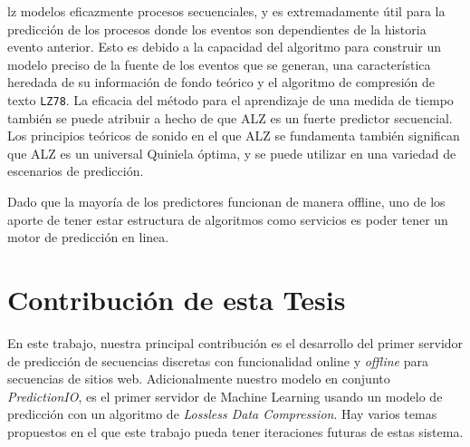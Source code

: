 %

lz modelos eficazmente procesos secuenciales, y es extremadamente útil para la predicción de los procesos donde los eventos son dependientes de la historia evento anterior. Esto es debido a la capacidad del algoritmo para construir un modelo preciso de la fuente de los eventos que se generan, una característica heredada de su información de fondo teórico y el algoritmo de compresión de texto \texttt{LZ78}.
%
La eficacia del método para el aprendizaje de una medida de tiempo también se puede atribuir a hecho de que ALZ es un fuerte predictor secuencial. Los principios teóricos de sonido en el que ALZ se fundamenta también significan que ALZ es un universal Quiniela óptima, y se puede utilizar en una variedad de escenarios de predicción.
%

Dado que la mayoría de los predictores funcionan de 
manera offline, uno de los aporte de tener estar estructura de algoritmos como servicios es poder tener un motor de predicción en linea.

\section{Contribución de esta Tesis}


En este trabajo,  nuestra principal contribución es el desarrollo del primer servidor de predicción de secuencias discretas con funcionalidad online y \emph{offline} para secuencias de  sitios web. Adicionalmente nuestro modelo en conjunto \emph{PredictionIO}, es el primer servidor de Machine Learning usando un modelo de predicción con un algoritmo de \emph{Lossless Data Compression}. Hay varios temas propuestos en el que este trabajo pueda tener iteraciones  futuras de estas sistema. 